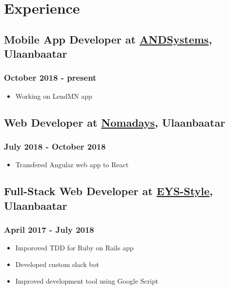 \documentclass[letterpaper]{article}
\date{\today}
\title{}
\begin{document}

\section{Experience}
\label{sec:org7e18179}
\subsection{Mobile App Developer at \href{https://andsystems.net}{ANDSystems}, Ulaanbaatar}
\label{sec:org5efc293}
\subsubsection{October 2018 - present}
\label{sec:orgf50c0b1}
\begin{itemize}
\item Working on LendMN app
\end{itemize}
\subsection{Web Developer at \href{https:nomadays.com}{Nomadays}, Ulaanbaatar}
\label{sec:orgd371bde}
\subsubsection{July 2018 - October 2018}
\label{sec:org94c0c4a}
\begin{itemize}
\item Transfered Angular web app to React
\end{itemize}
\subsection{Full-Stack Web Developer at \href{http:www.eys-style.com}{EYS-Style}, Ulaanbaatar}
\label{sec:orgbb52049}
\subsubsection{April 2017 - July 2018}
\label{sec:org0422ea6}
\begin{itemize}
\item Imporoved TDD for Ruby on Rails app
\item Developed custom slack bot
\item Improved development tool using Google Script
\end{itemize}
\end{document}
